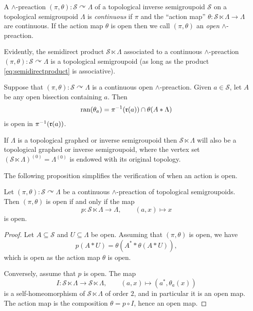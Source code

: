 \begin{definition}
    A $\land$-preaction $(\pi,\theta)\colon\mathcal{S}\curvearrowright\Lambda$ of a topological inverse semigroupoid $\mathcal{S}$ on a topological semigroupoid $\Lambda$ is \emph{continuous} if $\pi$ and the ``action map'' $\theta\colon\mathcal{S}\ltimes\Lambda\to\Lambda$ are continuous. If the action map $\theta$ is open then we call $(\pi,\theta)$ an \emph{open} $\land$-preaction.
\end{definition}

Evidently, the semidirect product $\mathcal{S}\ltimes\Lambda$ associated to a continuous $\land$-preaction $(\pi,\theta)\colon\mathcal{S}\curvearrowright\Lambda$ is a topological semigroupoid (as long as the product \eqref{eq:semidirectproduct} is associative).

\begin{remark}
Suppose that $(\pi,\theta)\colon\mathcal{S}\curvearrowright\Lambda$ is a continuous open $\land$-preaction. Given $a\in\mathcal{S}$, let $A$ be any open bisection containing $a$. Then \[\operatorname{ran}(\theta_a)=\pi^{-1}(\operatorname{\mathfrak{r}}(a))\cap\theta(A\ast\Lambda)\]
is open in $\pi^{-1}(\operatorname{\mathfrak{r}}(a))$.
\end{remark}

If $\Lambda$ is a topological graphed or inverse semigroupoid then $\mathcal{S}\ltimes\Lambda$ will also be a topological graphed or inverse semigroupoid, where the vertex set $(\mathcal{S}\ltimes\Lambda)^{(0)}=\Lambda^{(0)}$ is endowed with its original topology.

The following proposition simplifies the verification of when an action is open.

\begin{proposition}\label{prop:preactionisopeniffprojectionisopen}
Let $(\pi,\theta)\colon\mathcal{S}\curvearrowright\Lambda$ be a continuous $\land$-preaction of topological semigroupoids. Then $(\pi,\theta)$ is open if and only if the map
\[p\colon\mathcal{S}\ltimes\Lambda\to\Lambda,\qquad(a,x)\mapsto x\]
is open.
\end{proposition}
\begin{proof}
Let $A\subseteq\mathcal{S}$ and $U\subseteq\Lambda$ be open. Assuming that $(\pi,\theta)$ is open, we have
\[p(A\ast U)=\theta(A^*\ast\theta(A\ast U)),\]
which is open as the action map $\theta$ is open.

Conversely, assume that $p$ is open. The map \[I\colon\mathcal{S}\ltimes\Lambda\to\mathcal{S}\ltimes\Lambda,\qquad (a,x)\mapsto (a^*,\theta_a(x))\]
is a self-homeomorphism of $\mathcal{S}\ltimes\Lambda$ of order $2$, and in particular it is an open map. The action map is the composition $\theta=p\circ I$, hence an open map.
\end{proof}

